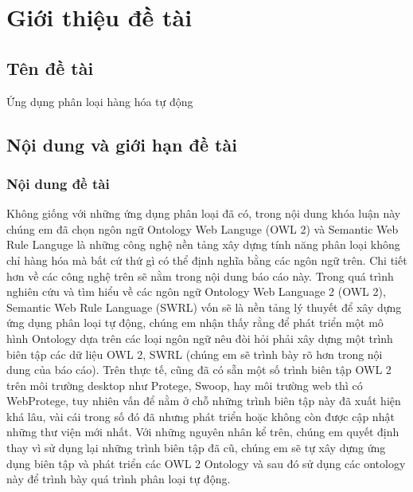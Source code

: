 \chapter {Giới thiệu đề tài}
\section{Tên đề tài}
Ứng dụng phân loại hàng hóa tự động
\section{Nội dung và giới hạn đề tài}
\subsection{Nội dung đề tài}
Không giống với những ứng dụng phân loại đã có, trong nội dung khóa luận này chúng em đã chọn ngôn ngữ Ontology Web Languge (OWL 2) và Semantic Web Rule Languge là những công nghệ nền tảng xây dựng tính năng phân loại không chỉ hàng hóa mà bất cứ thứ gì có thể định nghĩa bằng các ngôn ngữ trên. Chi tiết hơn về các công nghệ trên sẽ nằm trong nội dung báo cáo này. 
Trong quá trình nghiên cứu và tìm hiểu về các ngôn ngữ Ontology Web Language 2 (OWL 2), Semantic Web Rule Language (SWRL) vốn sẽ là nền tảng lý thuyết để xây dựng ứng dụng phân loại tự động, chúng em nhận thấy rằng để phát triển một mô hình Ontology dựa trên các loại ngôn ngữ nêu đòi hỏi phải xây dựng một trình biên tập các dữ liệu OWL 2, SWRL (chúng em sẽ trình bày rõ hơn trong nội dung của báo cáo). Trên thực tế, cũng đã có sẵn một số trình biên tập OWL 2 trên môi trường desktop như Protege, Swoop, hay môi trường web thì có WebProtege, tuy nhiên vấn để nằm ở chỗ những trình biên tập này đã xuất hiện khá lâu, vài cái trong số đó đã nhưng phát triển hoặc không còn được cập nhật những thư viện mới nhất.  Với những nguyên nhân kể trên, chúng em quyết định thay vì sử dụng lại những trình biên tập đã cũ, chúng em sẽ tự xây dựng ứng dụng biên tập và phát triển các OWL 2 Ontology và sau đó sử dụng các ontology này để trình bày quá trình phân loại tự động.
